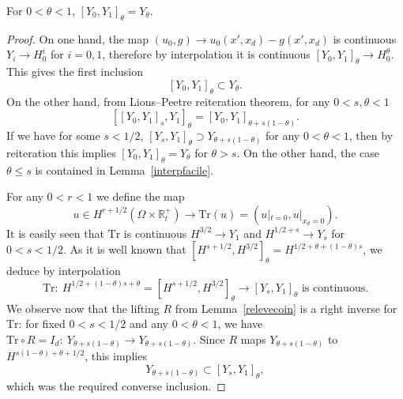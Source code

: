 \documentclass[10pt]{amsart}
\theoremstyle{definition}\newtheorem{defi}[theo]{Definition}\newtheorem{rema}[theo]{Remark}\newtheorem{exam}[theo]{Example}\newtheorem{exem}[theo]{Example}\newtheorem{nota}[theo]{Notation}
\newcommand{\R}{\mathbb{R}}
\newcommand{\Tr}{\mathrm{Tr}}
\begin{document}
\begin{prop}
For $0<\theta<1$, $[Y_0,Y_1]_\theta=Y_\theta$.
\end{prop}
\begin{proof}
On one hand, the map $(u_0,g)\to u_0(x',x_d)-g(x',x_d)$ is continuous $Y_i\to H^i_0$ for $i=0,1$, therefore by interpolation it is continuous $[Y_0,Y_1]_\theta\to H^\theta_0$. This gives the first inclusion
\begin{equation}\label{inclusion}
[Y_0,Y_1]_\theta\subset Y_\theta.
\end{equation}
On the other hand, from Lions--Peetre reiteration theorem, for any $0<s,\theta<1$
\[
[[Y_0,Y_1]_s,Y_1]_\theta=[Y_0,Y_1]_{\theta+s(1-\theta)}.
\]
If we have for some $s<1/2$, $[Y_s,Y_1]_\theta\supset Y_{\theta+s(1-\theta)}$ for any $0<\theta<1$, then by reiteration this implies $[Y_0,Y_1]_\theta=Y_\theta$ for $\theta >s$. On the other hand, the case $\theta\leq s$ is contained in Lemma~\ref{interpfacile}.

For any $0<r<1$ we define the map
\[
u\in H^{r+1/2}\left(\Omega\times \R_t^+\right)
\to \Tr(u)=\left(u|_{t=0},u|_{x_d=0}\right).
\]
It is easily seen that $\Tr$ is continuous $H^{3/2}\to Y_1$ and $H^{1/2+s}\to Y_s$ for $0<s<1/2$. As it is well known that $[H^{s+1/2},H^{3/2}]_{\theta}=H^{1/2+\theta +(1-\theta)s}$, we deduce by interpolation
\[
\Tr:\ H^{1/2+(1-\theta)s+\theta}=\left[H^{s+1/2},H^{3/2}\right]_\theta\to [Y_s,Y_1]_\theta\text{ is continuous}.
\]
We observe now that the lifting $R$ from Lemma~\ref{relevecoin} is a right inverse for $\Tr$: for fixed $0<s<1/2$ and any $0<\theta<1$, we have $\Tr\circ R=I_d:\ Y_{\theta+s(1-\theta)}
\to Y_{\theta+s(1-\theta)}$. Since $R$ maps $Y_{\theta+s(1-\theta)}$ to $H^{s(1-\theta)+\theta+1/2}$, this implies
\[
Y_{\theta+s(1-\theta)}\subset [Y_s,Y_1]_\theta,
\]
which was the required converse inclusion.
\end{proof}

\end{document}
